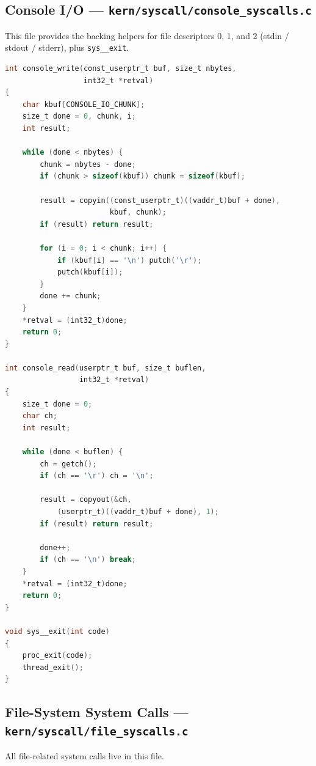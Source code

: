 \documentclass[11pt,a4paper]{article}
\begin{document}
\FloatBarrier
\newpage
\subsection{Console I/O ---
            \texttt{kern/syscall/console\_syscalls.c}}
This file provides the backing helpers for file descriptors 0, 1, and 2
(stdin / stdout / stderr), plus \texttt{sys\_\_exit}.

\begin{lstlisting}[language=C,
  caption={\texttt{console\_write}, \texttt{console\_read}, and
           \texttt{sys\_\_exit}.}]
int console_write(const_userptr_t buf, size_t nbytes,
                  int32_t *retval)
{
	char kbuf[CONSOLE_IO_CHUNK];
	size_t done = 0, chunk, i;
	int result;

	while (done < nbytes) {
		chunk = nbytes - done;
		if (chunk > sizeof(kbuf)) chunk = sizeof(kbuf);

		result = copyin((const_userptr_t)((vaddr_t)buf + done),
		                kbuf, chunk);
		if (result) return result;

		for (i = 0; i < chunk; i++) {
			if (kbuf[i] == '\n') putch('\r');
			putch(kbuf[i]);
		}
		done += chunk;
	}
	*retval = (int32_t)done;
	return 0;
}

int console_read(userptr_t buf, size_t buflen,
                 int32_t *retval)
{
	size_t done = 0;
	char ch;
	int result;

	while (done < buflen) {
		ch = getch();
		if (ch == '\r') ch = '\n';

		result = copyout(&ch,
		    (userptr_t)((vaddr_t)buf + done), 1);
		if (result) return result;

		done++;
		if (ch == '\n') break;
	}
	*retval = (int32_t)done;
	return 0;
}

void sys__exit(int code)
{
	proc_exit(code);
	thread_exit();
}
\end{lstlisting}

\FloatBarrier
\newpage
\subsection{File-System System Calls ---
            \texttt{kern/syscall/file\_syscalls.c}}
All file-related system calls live in this file.
\end{document}
